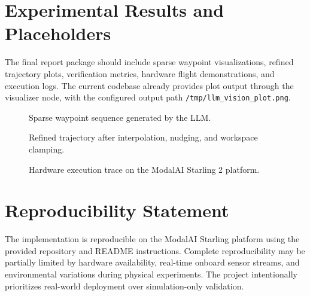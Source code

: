 \documentclass[11pt]{article}
\begin{document}
\section{Experimental Results and Placeholders}

The final report package should include sparse waypoint visualizations, refined trajectory plots, verification metrics, hardware flight demonstrations, and execution logs. The current codebase already provides plot output through the visualizer node, with the configured output path \texttt{/tmp/llm\_vision\_plot.png}.

\begin{figure}[H]
\centering
{}
\caption{Sparse waypoint sequence generated by the LLM.}
\label{fig:sparse-placeholder}
\end{figure}

\begin{figure}[H]
\centering
{}
\caption{Refined trajectory after interpolation, nudging, and workspace clamping.}
\label{fig:refined-placeholder}
\end{figure}

\begin{figure}[H]
\centering
{}
\caption{Hardware execution trace on the ModalAI Starling 2 platform.}
\label{fig:hardware-placeholder}
\end{figure}

\section{Reproducibility Statement}

The implementation is reproducible on the ModalAI Starling platform using the provided repository and README instructions. Complete reproducibility may be partially limited by hardware availability, real-time onboard sensor streams, and environmental variations during physical experiments. The project intentionally prioritizes real-world deployment over simulation-only validation.
\end{document}
